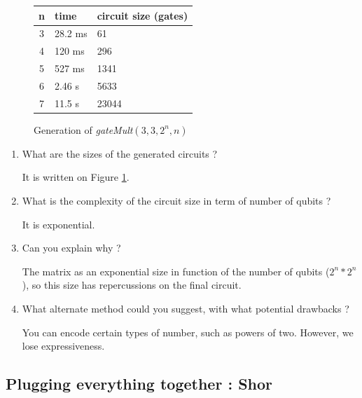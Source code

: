 \documentclass{article}
\theoremstyle{plain}
\begin{document}
      \begin{figure}[htb]
        \begin{center}

        \begin{tabular}{c|l|l}
          n & time & circuit size (gates) \\
          \hline
          3 & 28.2 ms & 61 \\
          4 & 120  ms & 296 \\
          5 & 527  ms & 1341 \\
          6 & 2.46  s & 5633 \\
          7 & 11.5  s & 23044
        \end{tabular}
      \label{tab:gateMult}
      \caption{Generation of \textit{gateMult}$(3, 3, 2^n, n)$}
      \end{center}
    \end{figure}

    \begin{enumerate}
      \item What are the sizes of the generated circuits ?

        It is written on Figure \ref{tab:gateMult}.

      \item What is the complexity of the circuit size in term of number of
        qubits ?

        It is exponential.

      \item Can you explain why ?

        The matrix as an exponential size in function of the number of qubits
        ($2^n * 2^n$), so this size has repercussions on the final circuit.

      \item What alternate method could you suggest, with what potential
        drawbacks ?

        You can encode certain types of number, such as powers of two.
        However, we lose expressiveness.
    \end{enumerate}

    \subsection{Plugging everything together : Shor}
\end{document}
